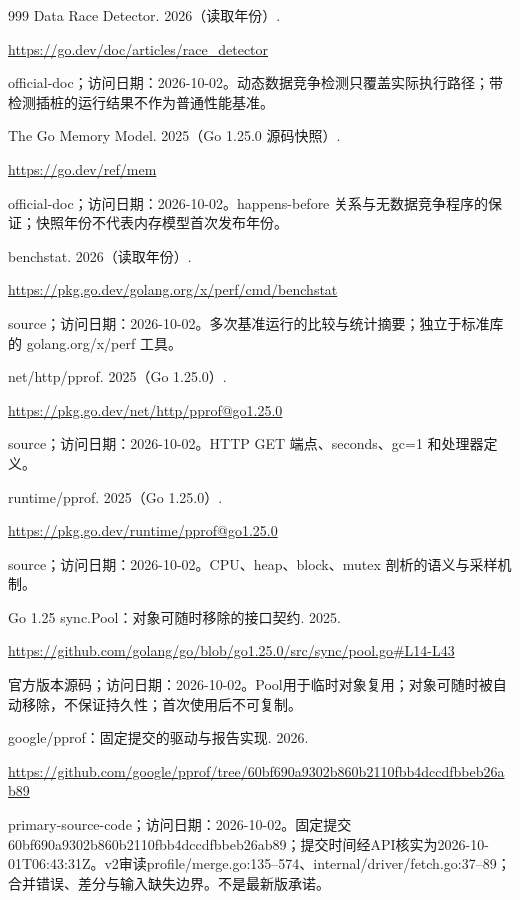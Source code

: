 \documentclass[UTF8,fontset=fandol,openany,11pt]{ctexbook}
\begin{document}
\begin{thebibliography}{999}
 Data Race Detector. 2026（读取年份）.\par
\url{https://go.dev/doc/articles/race_detector}\par
{\small official-doc；访问日期：2026-10-02。动态数据竞争检测只覆盖实际执行路径；带检测插桩的运行结果不作为普通性能基准。}

 The Go Memory Model. 2025（Go 1.25.0 源码快照）.\par
\url{https://go.dev/ref/mem}\par
{\small official-doc；访问日期：2026-10-02。happens-\allowbreak{}before 关系与无数据竞争程序的保证；快照年份不代表内存模型首次发布年份。}

 benchstat. 2026（读取年份）.\par
\url{https://pkg.go.dev/golang.org/x/perf/cmd/benchstat}\par
{\small source；访问日期：2026-10-02。多次基准运行的比较与统计摘要；独立于标准库的 golang.\allowbreak{}org/\allowbreak{}x/\allowbreak{}perf 工具。}

 net/http/pprof. 2025（Go 1.25.0）.\par
\url{https://pkg.go.dev/net/http/pprof@go1.25.0}\par
{\small source；访问日期：2026-10-02。HTTP GET 端点、seconds、gc=1 和处理器定义。}

 runtime/pprof. 2025（Go 1.25.0）.\par
\url{https://pkg.go.dev/runtime/pprof@go1.25.0}\par
{\small source；访问日期：2026-10-02。CPU、heap、block、mutex 剖析的语义与采样机制。}

 Go 1.25 sync.Pool：对象可随时移除的接口契约. 2025.\par
\url{https://github.com/golang/go/blob/go1.25.0/src/sync/pool.go#L14-L43}\par
{\small 官方版本源码；访问日期：2026-10-02。Pool用于临时对象复用；对象可随时被自动移除，不保证持久性；首次使用后不可复制。}

 google/pprof：固定提交的驱动与报告实现. 2026.\par
\url{https://github.com/google/pprof/tree/60bf690a9302b860b2110fbb4dccdfbbeb26ab89}\par
{\small primary-source-code；访问日期：2026-10-02。固定提交60bf690a93\allowbreak{}02b860b211\allowbreak{}0fbb4dccdf\allowbreak{}bbeb26ab89；提交时间经API核实为2026-\allowbreak{}10-\allowbreak{}01T06:\allowbreak{}43:\allowbreak{}31Z。v2审读profile/\allowbreak{}merge.\allowbreak{}go:\allowbreak{}135–574、internal/\allowbreak{}driver/\allowbreak{}fetch.\allowbreak{}go:\allowbreak{}37–89；合并错误、差分与输入缺失边界。不是最新版承诺。}


\end{thebibliography}
\end{document}
